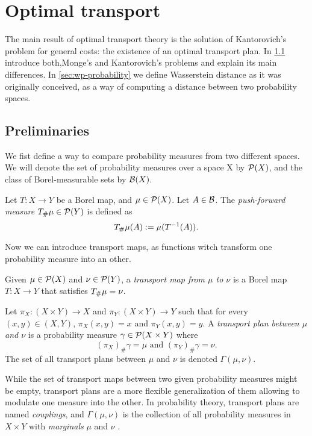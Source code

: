 \section{Optimal transport} \label{sec:optimal-transport}
The main result of optimal transport theory is the solution of Kantorovich's problem for general costs: the existence of an optimal transport plan. In \ref{sec:preliminaries} introduce both,Monge's and Kantorovich's problems and explain its main differences. In \ref{sec:wp-probability} we define Wasserstein distance as it was originally conceived, as a way of computing a distance between two probability spaces.

\subsection{Preliminaries} \label{sec:preliminaries}
We fist define a way to compare probability measures from two different spaces. We will denote the set of probability measures over a space X by $ \mathcal P(X) $, and the class of Borel-measurable sets by $ \mathcal B(X) $.

\begin{definition}
    Let $ T: X \to Y $ be a Borel map, and $ \mu \in \mathcal P(X)$. Let $ A \in \mathcal B $. The {\it push-forward measure} $ T_\#\mu \in \mathcal P(Y) $ is defined as
    $$
        T_\#\mu(A) := \mu (T^{-1}(A)).
    $$
\end{definition}

Now we can introduce transport maps, as functions witch transform one probability measure into an other.

\begin{definition}
    Given $ \mu \in \mathcal P(X) $ and $ \nu \in \mathcal P(Y) $, a {\it transport map from $\mu$ to $\nu$} is a Borel map $ T: X \to Y $ that satisfies $ T_\#\mu = \nu$.
\end{definition}

\begin{definition}
    Let $\pi_X : (X \times Y) \to X $ and $\pi_Y : (X \times Y) \to Y$ such that for every $(x, y) \in (X, Y) $, $\pi_X(x, y) = x$ and $ \pi_Y(x, y) = y $. A {\it transport plan between $\mu$ and $\nu$} is a probability measure $ \gamma \in \mathcal P(X \times Y) $ where
    $$
        (\pi_X)_\# \gamma = \mu \text{ and } (\pi_Y)_\# \gamma = \nu.
    $$
    The set of all transport plans between $ \mu $ and $\nu$ is denoted $\Gamma(\mu, \nu)$.
\end{definition}

While the set of transport maps between two given probability measures might be empty, transport plans are a more flexible generalization of them allowing to modulate one measure into the other. In probability theory, transport plans are named {\it couplings}, and $\Gamma(\mu, \nu)$ is the collection of all probability measures in $ X \times Y $ with {\it marginals} $ \mu $ and $ \nu $ \cite{class}.

